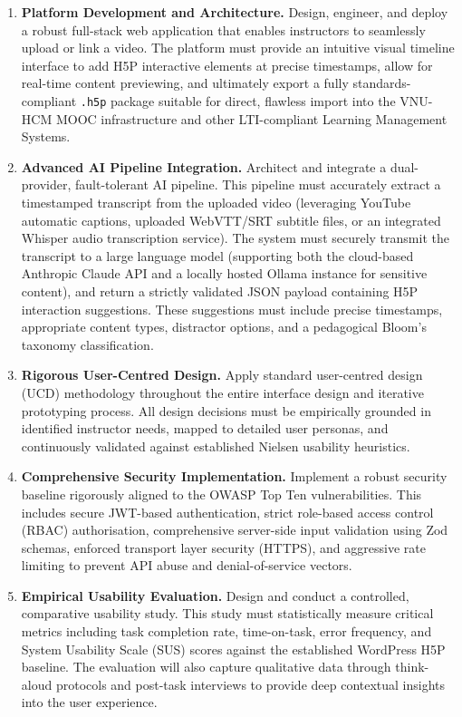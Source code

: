 \begin{enumerate}
  \item \textbf{Platform Development and Architecture.} Design, engineer, and deploy a robust full-stack web application that enables instructors to seamlessly upload or link a video. The platform must provide an intuitive visual timeline interface to add H5P interactive elements at precise timestamps, allow for real-time content previewing, and ultimately export a fully standards-compliant \texttt{.h5p} package suitable for direct, flawless import into the VNU-HCM MOOC infrastructure and other LTI-compliant Learning Management Systems.

  \item \textbf{Advanced AI Pipeline Integration.} Architect and integrate a dual-provider, fault-tolerant AI pipeline. This pipeline must accurately extract a timestamped transcript from the uploaded video (leveraging YouTube automatic captions, uploaded WebVTT/SRT subtitle files, or an integrated Whisper audio transcription service). The system must securely transmit the transcript to a large language model (supporting both the cloud-based Anthropic Claude API and a locally hosted Ollama instance for sensitive content), and return a strictly validated JSON payload containing H5P interaction suggestions. These suggestions must include precise timestamps, appropriate content types, distractor options, and a pedagogical Bloom's taxonomy classification.

  \item \textbf{Rigorous User-Centred Design.} Apply standard user-centred design (UCD) methodology throughout the entire interface design and iterative prototyping process. All design decisions must be empirically grounded in identified instructor needs, mapped to detailed user personas, and continuously validated against established Nielsen usability heuristics.

  \item \textbf{Comprehensive Security Implementation.} Implement a robust security baseline rigorously aligned to the OWASP Top Ten vulnerabilities. This includes secure JWT-based authentication, strict role-based access control (RBAC) authorisation, comprehensive server-side input validation using Zod schemas, enforced transport layer security (HTTPS), and aggressive rate limiting to prevent API abuse and denial-of-service vectors.

  \item \textbf{Empirical Usability Evaluation.} Design and conduct a controlled, comparative usability study. This study must statistically measure critical metrics including task completion rate, time-on-task, error frequency, and System Usability Scale (SUS) scores against the established WordPress H5P baseline. The evaluation will also capture qualitative data through think-aloud protocols and post-task interviews to provide deep contextual insights into the user experience.
\end{enumerate}


